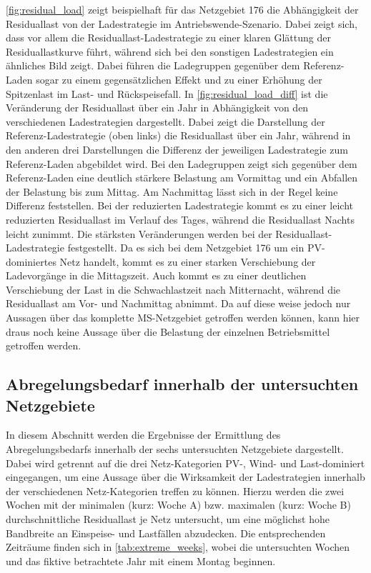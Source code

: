 \autoref{fig:residual_load} zeigt beispielhaft für das Netzgebiet \num{176} die Abhängigkeit der Residuallast von der Ladestrategie im Antriebswende-Szenario.
Dabei zeigt sich, dass vor allem die Residuallast-Ladestrategie zu einer klaren Glättung der Residuallastkurve führt, während sich bei den sonstigen Ladestrategien ein ähnliches Bild zeigt.
Dabei führen die Ladegruppen gegenüber dem Referenz-Laden sogar zu einem gegensätzlichen Effekt und zu einer Erhöhung der Spitzenlast im Last- und Rückspeisefall.
In \autoref{fig:residual_load_diff} ist die Veränderung der Residuallast über ein Jahr in Abhängigkeit von den verschiedenen Ladestrategien dargestellt.
Dabei zeigt die Darstellung der Referenz-Ladestrategie (oben links) die Residuallast über ein Jahr, während in den anderen drei Darstellungen die Differenz der jeweiligen Ladestrategie zum Referenz-Laden abgebildet wird.
Bei den Ladegruppen zeigt sich gegenüber dem Referenz-Laden eine deutlich stärkere Belastung am Vormittag und ein Abfallen der Belastung bis zum Mittag.
Am Nachmittag lässt sich in der Regel keine Differenz feststellen.
Bei der reduzierten Ladestrategie kommt es zu einer leicht reduzierten Residuallast im Verlauf des Tages, während die Residuallast Nachts leicht zunimmt.
Die stärksten Veränderungen werden bei der Residuallast-Ladestrategie festgestellt.
Da es sich bei dem Netzgebiet \num{176} um ein \gls{PV}-dominiertes Netz handelt, kommt es zu einer starken Verschiebung der Ladevorgänge in die Mittagszeit.
Auch kommt es zu einer deutlichen Verschiebung der Last in die Schwachlastzeit nach Mitternacht, während die Residuallast am Vor- und Nachmittag abnimmt.
Da auf diese weise jedoch nur Aussagen über das komplette \gls{MS}-Netzgebiet getroffen werden können, kann hier draus noch keine Aussage über die Belastung der einzelnen Betriebsmittel getroffen werden.





\subsection{Abregelungsbedarf innerhalb der untersuchten Netzgebiete}

In diesem Abschnitt werden die Ergebnisse der Ermittlung des Abregelungsbedarfs innerhalb der sechs untersuchten Netzgebiete dargestellt.
Dabei wird getrennt auf die drei Netz-Kategorien \gls{PV}-, Wind- und Last-dominiert eingegangen, um eine Aussage über die Wirksamkeit der Ladestrategien innerhalb der verschiedenen Netz-Kategorien treffen zu können.
Hierzu werden die zwei Wochen mit der minimalen (kurz: Woche A) bzw. maximalen (kurz: Woche B) durchschnittliche Residuallast je Netz untersucht, um eine möglichst hohe Bandbreite an Einspeise- und Lastfällen abzudecken.
Die entsprechenden Zeiträume finden sich in \autoref{tab:extreme_weeks}, wobei die untersuchten Wochen und das fiktive betrachtete Jahr mit einem Montag beginnen.

